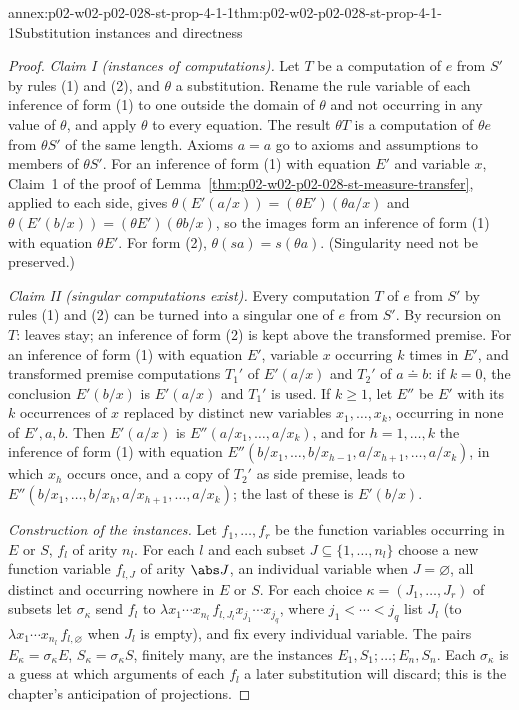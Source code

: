 \begin{annexitem}{annex:p02-w02-p02-028-st-prop-4-1-1}{thm:p02-w02-p02-028-st-prop-4-1-1}{Substitution instances and directness}
\begin{proof}
\emph{Claim I (instances of computations).}  Let \(T\) be a computation of
\(e\) from \(S'\) by rules (1) and (2), and \(\theta\) a substitution.  Rename
the rule variable of each inference of form (1) to one outside the domain of
\(\theta\) and not occurring in any value of \(\theta\), and apply \(\theta\) to
every equation.  The result \(\theta T\) is a computation of \(\theta e\) from
\(\theta S'\) of the same length.  Axioms \(a=a\) go to axioms and assumptions
to members of \(\theta S'\).  For an inference of form (1) with equation
\(E'\) and variable \(x\), Claim~1 of the proof of
Lemma~\ref{thm:p02-w02-p02-028-st-measure-transfer}, applied to each side,
gives \(\theta(E'(a/x))=(\theta E')(\theta a/x)\) and
\(\theta(E'(b/x))=(\theta E')(\theta b/x)\), so the images form an inference
of form (1) with equation \(\theta E'\).  For form (2),
\(\theta(sa)=s(\theta a)\).  (Singularity need not be preserved.)

\emph{Claim II (singular computations exist).}  Every computation \(T\) of
\(e\) from \(S'\) by rules (1) and (2) can be turned into a singular one of
\(e\) from \(S'\).  By recursion on \(T\): leaves stay; an inference of form
(2) is kept above the transformed premise.  For an inference of form (1) with
equation \(E'\), variable \(x\) occurring \(k\) times in \(E'\), and
transformed premise computations \(T_1'\) of \(E'(a/x)\) and \(T_2'\) of
\(a\doteq b\): if \(k=0\), the conclusion \(E'(b/x)\) is \(E'(a/x)\) and
\(T_1'\) is used.  If \(k\geq1\), let \(E''\) be \(E'\) with its \(k\)
occurrences of \(x\) replaced by distinct new variables \(x_1,\ldots,x_k\),
occurring in none of \(E',a,b\).  Then \(E'(a/x)\) is
\(E''(a/x_1,\ldots,a/x_k)\), and for \(h=1,\ldots,k\) the inference of form
(1) with equation \(E''(b/x_1,\ldots,b/x_{h-1},a/x_{h+1},\ldots,a/x_k)\),
in which \(x_h\) occurs once, and a copy of \(T_2'\) as side premise, leads to
\(E''(b/x_1,\ldots,b/x_h,a/x_{h+1},\ldots,a/x_k)\); the last of these is
\(E'(b/x)\).

\emph{Construction of the instances.}  Let \(f_1,\ldots,f_r\) be the
function variables occurring in \(E\) or \(S\), \(f_l\) of arity \(n_l\).
For each \(l\) and each subset \(J\subseteq\{1,\ldots,n_l\}\) choose a new
function variable \(f_{l,J}\) of arity \(\abs J\), an individual variable
when \(J=\varnothing\), all distinct and occurring nowhere in \(E\) or \(S\).
For each choice \(\kappa=(J_1,\ldots,J_r)\) of subsets let \(\sigma_\kappa\)
send \(f_l\) to \(\lambda x_1\cdots x_{n_l}\,f_{l,J_l}x_{j_1}\cdots x_{j_q}\),
where \(j_1<\cdots<j_q\) list \(J_l\) (to \(\lambda x_1\cdots x_{n_l}\,f_{l,\varnothing}\)
when \(J_l\) is empty), and fix every individual variable.  The pairs
\(E_\kappa=\sigma_\kappa E\), \(S_\kappa=\sigma_\kappa S\), finitely many,
are the instances \(E_1,S_1;\ldots;E_n,S_n\).  Each \(\sigma_\kappa\) is a
guess at which arguments of each \(f_l\) a later substitution will
discard; this is the chapter's anticipation of projections.


\end{proof}
\end{annexitem}
